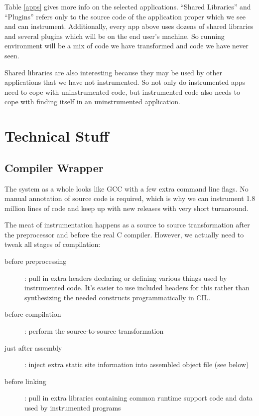 \documentclass[10pt,twocolumn]{article}
\begin{document}
Table \ref{apps} gives more info on the selected applications.
``Shared Libraries'' and ``Plugins'' refers only to the source code of
the application proper which we see and can instrument.  Additionally,
every app above uses dozens of shared libraries and several plugins
which will be on the end user's machine.  So running environment will
be a mix of code we have transformed and code we have never seen.

Shared libraries are also interesting because they may be used by
other applications that we have not instrumented.  So not only do
instrumented apps need to cope with uninstrumented code, but
instrumented code also needs to cope with finding itself in an
uninstrumented application.

\section{Technical Stuff}

\subsection{Compiler Wrapper}

The system as a whole looks like GCC with a few extra command line
flags.  No manual annotation of source code is required, which is why
we can instrument 1.8 million lines of code and keep up with new
releases with very short turnaround.

The meat of instrumentation happens as a source to source
transformation after the preprocessor and before the real C compiler.
However, we actually need to tweak all stages of compilation:

\begin{description}
\item[before preprocessing]: pull in extra headers declaring or
  defining various things used by instrumented code.  It's easier to
  use included headers for this rather than synthesizing the needed
  constructs programmatically in CIL.
\item[before compilation]: perform the source-to-source transformation
\item[just after assembly]: inject extra static site information into
  assembled object file (see below)
\item[before linking]: pull in extra libraries containing common
  runtime support code and data used by instrumented programs
\end{description}
\end{document}
